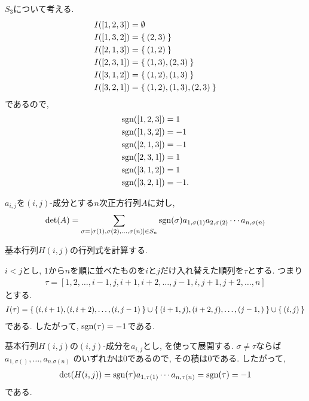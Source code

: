 \begin{example}
  $S_3$について考える.
  \begin{align*}
    I([1,2,3])&=\emptyset\\
    I([1,3,2])&=\Set{(2,3)}\\
    I([2,1,3])&=\Set{(1,2)}\\
    I([2,3,1])&=\Set{(1,3),(2,3)}\\
    I([3,1,2])&=\Set{(1,2),(1,3)}\\
    I([3,2,1])&=\Set{(1,2),(1,3),(2,3)}
  \end{align*}
  であるので,
  \begin{align*}
    \operatorname{sgn}([1,2,3])&=1\\
    \operatorname{sgn}([1,3,2])&=-1\\
    \operatorname{sgn}([2,1,3])&=-1\\
    \operatorname{sgn}([2,3,1])&=1\\
    \operatorname{sgn}([3,1,2])&=1\\
    \operatorname{sgn}([3,2,1])&=-1.
  \end{align*}
\end{example}

\begin{theorem}
  \label{thm:det:closedformula}
  $a_{i,j}$を$(i,j)$-成分とする$n$次正方行列$A$に対し,
  \begin{align*}
    \det(A)=\sum_{\sigma=[\sigma(1),\sigma(2),\ldots,\sigma(n)]\in S_n}
    \operatorname{sgn}(\sigma)
    a_{1,\sigma(1)}a_{2,\sigma(2)}\cdots a_{n,\sigma(n)}
  \end{align*}
\end{theorem}

基本行列$H(i,j)$の行列式を計算する.
\begin{example}
  $i<j$とし,
  $1$から$n$を順に並べたものを$i$と$j$だけ入れ替えた順列を$\tau$とする.
  つまり
  \begin{align*}
    \tau=[1,2,\ldots,i-1,j,i+1,i+2,\ldots,j-1,i,j+1,j+2,\ldots,n]
  \end{align*}
  とする.
  \begin{align*}
    I(\tau)=\Set{(i,i+1),(i,i+2),\ldots,(i,j-1)}\cup\Set{(i+1,j),(i+2,j),\ldots,(j-1,)}\cup\Set{(i,j)}
  \end{align*}
  である.  したがって, $\operatorname{sgn}(\tau)=-1$である.
  
  基本行列$H(i,j)$の$(i,j)$-成分を$a_{i,j}$とし,
  を使って展開する.
  $\sigma\neq \tau$ならば
  $a_{1,\sigma()},\ldots,a_{n.\sigma(n)}$
  のいずれかは$0$であるので, その積は$0$である.
  したがって,
  \begin{align*}
    \det(H(i,j))=\operatorname{sgn}(\tau)a_{1,\tau(1)}\cdots a_{n,\tau(n)}=\operatorname{sgn}(\tau)=-1
  \end{align*}
  である.
\end{example}


